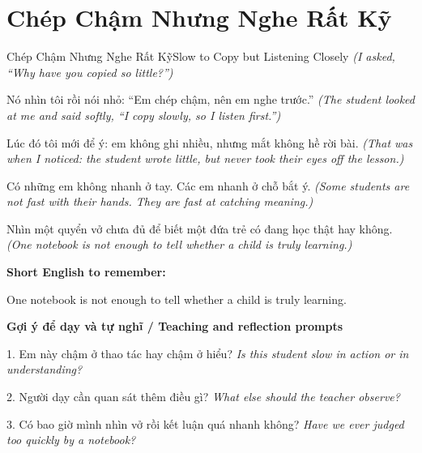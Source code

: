 \section{Chép Chậm Nhưng Nghe Rất Kỹ}
\begin{truyen}{Chép Chậm Nhưng Nghe Rất Kỹ}{Slow to Copy but Listening Closely}
\textit{(I asked, “Why have you copied so little?”)}

Nó nhìn tôi rồi nói nhỏ: “Em chép chậm, nên em nghe trước.”
\textit{(The student looked at me and said softly, “I copy slowly, so I listen first.”)}

Lúc đó tôi mới để ý: em không ghi nhiều, nhưng mắt không hề rời bài.
\textit{(That was when I noticed: the student wrote little, but never took their eyes off the lesson.)}

Có những em không nhanh ở tay. Các em nhanh ở chỗ bắt ý.
\textit{(Some students are not fast with their hands. They are fast at catching meaning.)}

\end{truyen}

\begin{baihoc}
Nhìn một quyển vở chưa đủ để biết một đứa trẻ có đang học thật hay không.
\textit{(One notebook is not enough to tell whether a child is truly learning.)}
\end{baihoc}

\begin{ghinhoanh}
\textbf{Short English to remember:}

One notebook is not enough to tell whether a child is truly learning.

\end{ghinhoanh}

\begin{tuhocnhanh}
\textbf{Gợi ý để dạy và tự nghĩ / Teaching and reflection prompts}

1. Em này chậm ở thao tác hay chậm ở hiểu? \textit{Is this student slow in action or in understanding?}

2. Người dạy cần quan sát thêm điều gì? \textit{What else should the teacher observe?}

3. Có bao giờ mình nhìn vở rồi kết luận quá nhanh không? \textit{Have we ever judged too quickly by a notebook?}
\end{tuhocnhanh}
\ngancach

